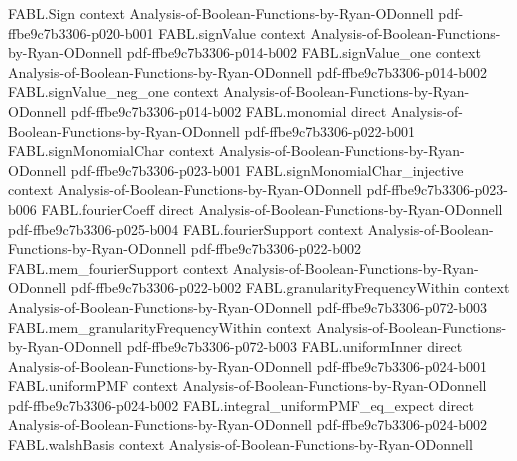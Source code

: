 \begin{theorem}
\label{FABL.FiniteFourierBasis.orthogonalComponent_add}
\leanok
{}
\proofstep
  {FABL.Sign}
  {context}
  {Analysis-of-Boolean-Functions-by-Ryan-ODonnell}
  {pdf-ffbe9c7b3306-p020-b001}
\proofstep
  {FABL.signValue}
  {context}
  {Analysis-of-Boolean-Functions-by-Ryan-ODonnell}
  {pdf-ffbe9c7b3306-p014-b002}
\proofstep
  {FABL.signValue_one}
  {context}
  {Analysis-of-Boolean-Functions-by-Ryan-ODonnell}
  {pdf-ffbe9c7b3306-p014-b002}
\proofstep
  {FABL.signValue_neg_one}
  {context}
  {Analysis-of-Boolean-Functions-by-Ryan-ODonnell}
  {pdf-ffbe9c7b3306-p014-b002}
\proofstep
  {FABL.monomial}
  {direct}
  {Analysis-of-Boolean-Functions-by-Ryan-ODonnell}
  {pdf-ffbe9c7b3306-p022-b001}
\proofstep
  {FABL.signMonomialChar}
  {context}
  {Analysis-of-Boolean-Functions-by-Ryan-ODonnell}
  {pdf-ffbe9c7b3306-p023-b001}
\proofstep
  {FABL.signMonomialChar_injective}
  {context}
  {Analysis-of-Boolean-Functions-by-Ryan-ODonnell}
  {pdf-ffbe9c7b3306-p023-b006}
\proofstep
  {FABL.fourierCoeff}
  {direct}
  {Analysis-of-Boolean-Functions-by-Ryan-ODonnell}
  {pdf-ffbe9c7b3306-p025-b004}
\proofstep
  {FABL.fourierSupport}
  {context}
  {Analysis-of-Boolean-Functions-by-Ryan-ODonnell}
  {pdf-ffbe9c7b3306-p022-b002}
\proofstep
  {FABL.mem_fourierSupport}
  {context}
  {Analysis-of-Boolean-Functions-by-Ryan-ODonnell}
  {pdf-ffbe9c7b3306-p022-b002}
\proofstep
  {FABL.granularityFrequencyWithin}
  {context}
  {Analysis-of-Boolean-Functions-by-Ryan-ODonnell}
  {pdf-ffbe9c7b3306-p072-b003}
\proofstep
  {FABL.mem_granularityFrequencyWithin}
  {context}
  {Analysis-of-Boolean-Functions-by-Ryan-ODonnell}
  {pdf-ffbe9c7b3306-p072-b003}
\proofstep
  {FABL.uniformInner}
  {direct}
  {Analysis-of-Boolean-Functions-by-Ryan-ODonnell}
  {pdf-ffbe9c7b3306-p024-b001}
\proofstep
  {FABL.uniformPMF}
  {context}
  {Analysis-of-Boolean-Functions-by-Ryan-ODonnell}
  {pdf-ffbe9c7b3306-p024-b002}
\proofstep
  {FABL.integral_uniformPMF_eq_expect}
  {direct}
  {Analysis-of-Boolean-Functions-by-Ryan-ODonnell}
  {pdf-ffbe9c7b3306-p024-b002}
\proofstep
  {FABL.walshBasis}
  {context}
  {Analysis-of-Boolean-Functions-by-Ryan-ODonnell}

\end{theorem}
